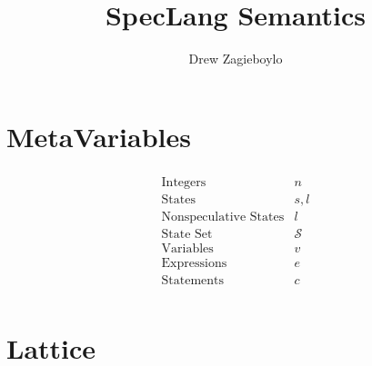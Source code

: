 \documentclass{article}
\begin{document}
\newcommand{\states}[0]{\ensuremath{\mathcal{S}}}

\title{SpecLang Semantics}
\author{Drew Zagieboylo}
\maketitle

\section{MetaVariables}
\begin{align*}
  \begin{array}{lc}
    \mbox{Integers} & n \\
    \mbox{States} & s, l \\
    \mbox{Nonspeculative States} & l\\
    \mbox{State Set} & \states\\
    \mbox{Variables} & v\\
    \mbox{Expressions} & e\\
    \mbox{Statements} & c\\
  \end{array}
\end{align*}

\section{Lattice}
\end{document}
